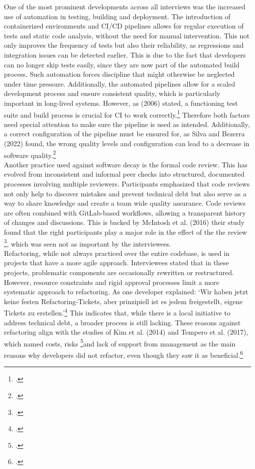 One of the most prominent developments across all interviews was the increased use of automation in testing, building and deployment. The introduction of containerized environments and CI/CD pipelines allows for regular execution of tests and static code analysis, without the need for manual intervention.
This not only improves the frequency of tests but also their reliability, as regressions and integration issues can be detected earlier. This is due to the fact that developers can no longer skip tests easily, since they are now part of the automated build process.
Such automation forces discipline that might otherwise be neglected under time pressure. Additionally, the automated pipelines allow for a scaled development process and ensure consistent quality, which is particularly important in long-lived systems.
However, as  (2006) stated, a functioning test suite and build process is crucial for CI to work correctly.\footcite[]{fowlerContinuousIntegration2006} Therefore both factors need special attention to make sure the pipeline is used as intended.
Additionally, a correct configuration of the pipeline must be ensured for, as Silva and Bezerra (2022) found, the wrong quality levels and configuration can lead to a decrease in software quality.\footcite[4]{silvaEmpiricalInvestigationInfluence2022}\\

Another practice used against software decay is the formal code review. This has evolved from inconsistent and informal peer checks into structured, documented processes involving multiple reviewers. Participants emphasized that code reviews not only help to discover mistakes and prevent technical debt but also
serve as a way to share knowledge and create a team wide quality assurance. Code reviews are often combined with GitLab-based workflows, allowing a transparent history of changes and discussions. This is backed by McIntosh et al. (2016) their study found that the right participants play a major role in the effect of the the review \footcite[39]{mcintoshEmpiricalStudyImpact2016},
which was seen not as important by the interviewees.\\

Refactoring, while not always practiced over the entire codebase, is used in projects that have a more agile approach. Interviewees stated that in these projects, problematic components are occasionally rewritten or restructured. However, resource constraints and rigid approval processes limit a more systematic approach to refactoring.
As one developer explained: `Wir haben jetzt keine festen Refactoring-Tickets, aber prinzipiell ist es jedem freigestellt, eigene Tickets zu erstellen.'\footcite{interview2} This indicates that, while there is a local initiative to address technical debt, a broader process is still lacking.
These reasons against refactoring align with the studies of Kim et al. (2014) and Tempero et al. (2017), which named costs, risks \footcite[17]{kimEmpiricalStudyRefactoring2014}and lack of support from management as the main reasons why developers did not refactor, even though they saw it as beneficial.\footcite[60]{temperoBarriersRefactoring2017}\\

